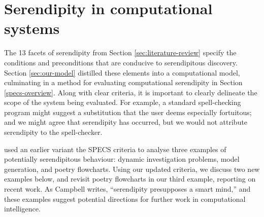 \section{Serendipity in computational systems} \label{sec:computational-serendipity}

The 13 facets of serendipity from Section \ref{sec:literature-review} specify the
conditions and preconditions that are conducive to serendipitous
discovery.  Section \ref{sec:our-model} distilled these elements into a computational model,
culminating in a method for evaluating computational serendipity in Section \ref{specs-overview}.
%
Along with clear criteria, it is important to clearly delineate the
scope of the system being evaluated.  For example, a standard
spell-checking program might suggest a substitution that the user
deems especially fortuitous; and we might agree that serendipity has
occurred, but we would not attribute serendipity to the spell-checker.

 used an earlier variant the SPECS criteria
to analyse three examples of potentially serendipitous behaviour:
dynamic investigation problems, model generation, and poetry
flowcharts.  Using our updated criteria, we discuss two new examples
below, and revisit poetry flowcharts in our third example, reporting
on recent work.  As Campbell \citeyear{campbell2005serendipity}
writes, ``serendipity presupposes a smart mind,'' and these examples
suggest potential directions for further work in computational
intelligence.



